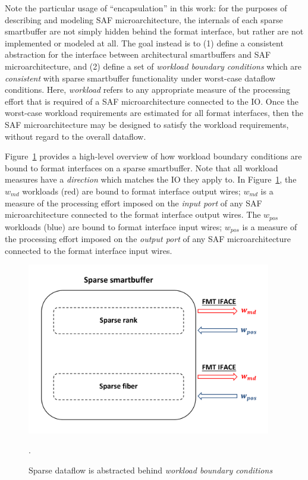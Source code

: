 Note the particular usage of ``encapsulation'' in this work: for the purposes of describing and modeling SAF microarchitecture, the internals of each sparse smartbuffer are not simply hidden behind the format interface, but rather are not implemented or modeled at all. The goal instead is to (1) define a consistent abstraction for the interface between architectural smartbuffers and SAF microarchitecture, and (2) define a set of \textit{workload boundary conditions} which are \textit{consistent} with sparse smartbuffer functionality under worst-case dataflow conditions. Here, \textit{workload} refers to any appropriate measure of the processing effort that is required of a SAF microarchitecture connected to the IO. Once the worst-case workload requirements are estimated for all format interfaces, then the SAF microarchitecture may be designed to satisfy the workload requirements, without regard to the overall dataflow. 

Figure~\ref{fig:sparse_sbuff_wkld_overview} provides a high-level overview of how workload boundary conditions are bound to format interfaces on a sparse smartbuffer. Note that all workload measures have a \textit{direction} which matches the IO they apply to. In Figure~\ref{fig:sparse_sbuff_wkld_overview}, the $w_{md}$ workloads (red) are bound to format interface output wires; $w_{md}$ is a measure of the processing effort imposed on the \textit{input port} of any SAF microarchitecture connected to the format interface output wires. The $w_{pos}$ workloads (blue) are bound to format interface input wires; $w_{pos}$ is a measure of the processing effort imposed on the \textit{output port} of any SAF microarchitecture connected to the format interface input wires.

\begin{figure}[ht]
    \centering
    \includegraphics[width=0.95\textwidth]{figures/sparse_sbuf_wkld_overview.pdf}
    \caption{Sparse dataflow is abstracted behind \textit{workload boundary conditions}}.
    \label{fig:sparse_sbuff_wkld_overview}
\end{figure}

